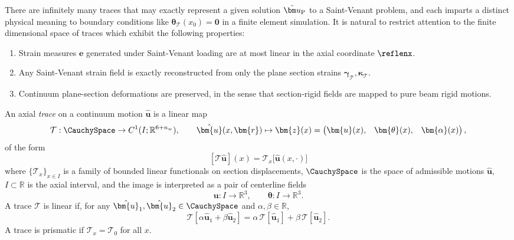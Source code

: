 There are infinitely many traces that may exactly represent a given solution \(\hat{\bm u}_{\rm P}\) to a Saint-Venant problem, and each imparts a distinct physical meaning to boundary conditions like \(\bm{\theta}_{\mathcal{T}}(x_0) = \mathbf{0}\) in a finite element simulation. 
It is natural to restrict attention to the finite dimensional space of traces which exhibit the following properties:
\begin{enumerate}
    \item Strain measures \(\bm{e}\) generated under Saint-Venant loading are at most linear in the axial coordinate $\reflenx$. 
    \item Any Saint-Venant strain field is exactly reconstructed from only the plane section strains \(\bm{\gamma}_{\mathcal{T}},\bm{\kappa}_{\mathcal{T}}\).
    \item Continuum plane-section deformations are preserved, in the sense that section‑rigid fields are mapped to pure beam rigid motions.
\end{enumerate}

\begin{definition}
\label{def:sv-trace}
An axial \emph{trace} 
on a continuum motion \(\hat{\bm u}\) 
is a linear map
\[
\mathcal{T} :\CauchySpace\to C^1(I;\mathbb{R}^{6+n_w}),
\qquad
\hat{\bm{u}}(x,\bm{r}) \mapsto 
\bm{z}(x) =
\begin{pmatrix}
\bm{u}(x),&
\bm{\theta}(x),&
\bm{\alpha}(x)
\end{pmatrix},
\]
of the form
$$[\mathcal{T}\hat{\bm{u}}](x) = \mathcal{T}_x\bigl[\hat{\bm{u}}(x, \cdot)\bigr]$$
where $\{\mathcal{T}_x\}_{x \in I}$ is a family of bounded linear functionals on section displacements, \(\CauchySpace\) is the space of admissible motions \(\hat{\bm u}\), 
$I \subset \mathbb{R}$ is the axial interval, and the image is interpreted 
as a pair of centerline fields
\[
\bm{u} : I \to \mathbb{R}^3,
\qquad
\bm{\theta} : I \to \mathbb{R}^3.
\]
A trace $\mathcal{T}$ is linear if, for any 
$\hat{\bm{u}}_1,\hat{\bm{u}}_2 \in \CauchySpace$ and 
$\alpha,\beta \in \mathbb{R}$,
\[
\mathcal{T}[\alpha \hat{\bm{u}}_1 + \beta \hat{\bm{u}}_2]
=
\alpha\,\mathcal{T}[\hat{\bm{u}}_1] + \beta\,\mathcal{T}[\hat{\bm{u}}_2].
\]
A trace is prismatic if $\mathcal{T}_x = \mathcal{T}_0$ for all $x$. 
\end{definition}

